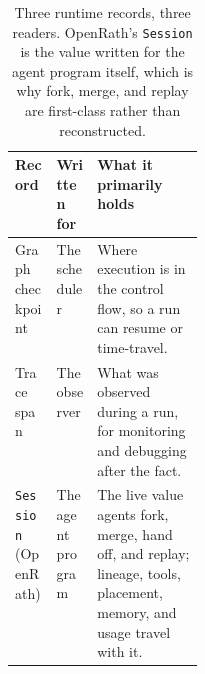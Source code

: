 \begin{table}[!htbp] \vspace{0.1em} \centering \small \caption{Three runtime records, three readers. OpenRath's \texttt{Session} is the value written for the agent program itself, which is why fork, merge, and replay are first-class rather than reconstructed.} \label{tab:session-vs-others} \begin{tabularx}{\linewidth}{@{}>{\raggedright\arraybackslash}p{0.22\linewidth}>{\raggedright\arraybackslash}X>{\raggedright\arraybackslash}X@{}} \toprule Record & Written for & What it primarily holds \\ \midrule Graph checkpoint & The scheduler & Where execution is in the control flow, so a run can resume or time-travel. \\ Trace span & The observer & What was observed during a run, for monitoring and debugging after the fact. \\ \texttt{Session} (OpenRath) & The agent program & The live value agents fork, merge, hand off, and replay; lineage, tools, placement, memory, and usage travel with it. \\ \bottomrule \end{tabularx} \vspace{0.1em} \end{table}